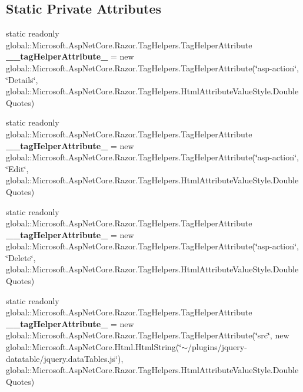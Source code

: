 \subsection*{Static Private Attributes}
\begin{DoxyCompactItemize}
\item 
\mbox{\label{class_asp_net_core_1_1_views___volunteers___index_a04618af990764b28e64bcaca511f7b7e}} 
static readonly global\+::\+Microsoft.\+Asp\+Net\+Core.\+Razor.\+Tag\+Helpers.\+Tag\+Helper\+Attribute {\bfseries \+\_\+\+\_\+tag\+Helper\+Attribute\+\_} = new global\+::\+Microsoft.\+Asp\+Net\+Core.\+Razor.\+Tag\+Helpers.\+Tag\+Helper\+Attribute(\char`\"{}asp-\/action\char`\"{}, \char`\"{}Details\char`\"{}, global\+::\+Microsoft.\+Asp\+Net\+Core.\+Razor.\+Tag\+Helpers.\+Html\+Attribute\+Value\+Style.\+Double\+Quotes)
\item 
\mbox{\label{class_asp_net_core_1_1_views___volunteers___index_a719a16fcdc32b7bfb263be22faeba4ca}} 
static readonly global\+::\+Microsoft.\+Asp\+Net\+Core.\+Razor.\+Tag\+Helpers.\+Tag\+Helper\+Attribute {\bfseries \+\_\+\+\_\+tag\+Helper\+Attribute\+\_} = new global\+::\+Microsoft.\+Asp\+Net\+Core.\+Razor.\+Tag\+Helpers.\+Tag\+Helper\+Attribute(\char`\"{}asp-\/action\char`\"{}, \char`\"{}Edit\char`\"{}, global\+::\+Microsoft.\+Asp\+Net\+Core.\+Razor.\+Tag\+Helpers.\+Html\+Attribute\+Value\+Style.\+Double\+Quotes)
\item 
\mbox{\label{class_asp_net_core_1_1_views___volunteers___index_aeec7e3a49c976867577948fd8ca3c5f7}} 
static readonly global\+::\+Microsoft.\+Asp\+Net\+Core.\+Razor.\+Tag\+Helpers.\+Tag\+Helper\+Attribute {\bfseries \+\_\+\+\_\+tag\+Helper\+Attribute\+\_} = new global\+::\+Microsoft.\+Asp\+Net\+Core.\+Razor.\+Tag\+Helpers.\+Tag\+Helper\+Attribute(\char`\"{}asp-\/action\char`\"{}, \char`\"{}Delete\char`\"{}, global\+::\+Microsoft.\+Asp\+Net\+Core.\+Razor.\+Tag\+Helpers.\+Html\+Attribute\+Value\+Style.\+Double\+Quotes)
\item 
\mbox{\label{class_asp_net_core_1_1_views___volunteers___index_a7fd1beeb7a432d923584d0dd0dc01b4c}} 
static readonly global\+::\+Microsoft.\+Asp\+Net\+Core.\+Razor.\+Tag\+Helpers.\+Tag\+Helper\+Attribute {\bfseries \+\_\+\+\_\+tag\+Helper\+Attribute\+\_} = new global\+::\+Microsoft.\+Asp\+Net\+Core.\+Razor.\+Tag\+Helpers.\+Tag\+Helper\+Attribute(\char`\"{}src\char`\"{}, new global\+::\+Microsoft.\+Asp\+Net\+Core.\+Html.\+Html\+String(\char`\"{}$\sim$/plugins/jquery-\/datatable/jquery.\+data\+Tables.\+js\char`\"{}), global\+::\+Microsoft.\+Asp\+Net\+Core.\+Razor.\+Tag\+Helpers.\+Html\+Attribute\+Value\+Style.\+Double\+Quotes)

\end{DoxyCompactItemize}
